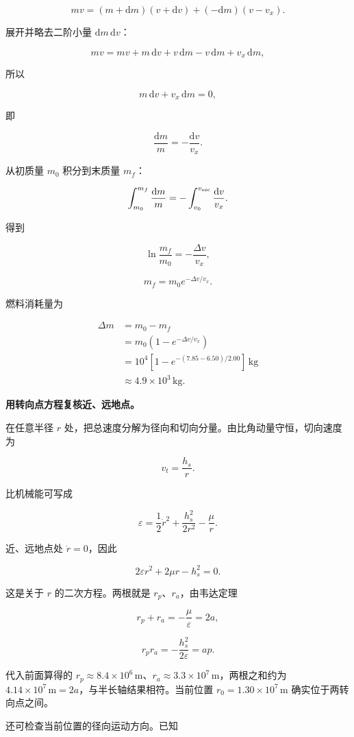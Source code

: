 \documentclass[12pt,a4paper,UTF8]{ctexart}
\begin{document}
\[mv=(m+\mathrm dm)(v+\mathrm dv)+(-\mathrm dm)(v-v_x).\]

展开并略去二阶小量 \(\mathrm dm\,\mathrm dv\)：

\[mv=mv+m\,\mathrm dv+v\,\mathrm dm-v\,\mathrm dm+v_x\,\mathrm dm,\]

所以

\[m\,\mathrm dv+v_x\,\mathrm dm=0,\]

即

\[\frac{\mathrm dm}{m}=-\frac{\mathrm dv}{v_x}.\]

从初质量 \(m_0\) 积分到末质量 \(m_f\)：

\[\int_{m_0}^{m_f}\frac{\mathrm dm}{m}
=-\int_{v_0}^{v_{\rm esc}}\frac{\mathrm dv}{v_x}.\]

得到

\[\ln\frac{m_f}{m_0}=-\frac{\Delta v}{v_x},\]

\[m_f=m_0e^{-\Delta v/v_x}.\]

燃料消耗量为

\[
\begin{aligned}
\Delta m
&=m_0-m_f\\
&=m_0\left(1-e^{-\Delta v/v_x}\right)\\
&=10^4\left[1-e^{-(7.85-6.50)/2.00}\right]\,\mathrm{kg}\\
&\approx\boxed{4.9\times10^3\,\mathrm{kg}}.
\end{aligned}
\]

\textbf{用转向点方程复核近、远地点。}

在任意半径 \(r\)
处，把总速度分解为径向和切向分量。由比角动量守恒，切向速度为

\[v_t=\frac{h_s}{r}.\]

比机械能可写成

\[\varepsilon=\frac12\dot r^2+\frac{h_s^2}{2r^2}-\frac\mu r.\]

近、远地点处 \(\dot r=0\)，因此

\[2\varepsilon r^2+2\mu r-h_s^2=0.\]

这是关于 \(r\) 的二次方程。两根就是 \(r_p\)、\(r_a\)，由韦达定理

\[r_p+r_a=-\frac{\mu}{\varepsilon}=2a,\]

\[r_pr_a=-\frac{h_s^2}{2\varepsilon}=ap.\]

代入前面算得的
\(r_p\approx8.4\times10^6\,\mathrm m\)、\(r_a\approx3.3\times10^7\,\mathrm m\)，两根之和约为
\(4.14\times10^7\,\mathrm m=2a\)，与半长轴结果相符。当前位置
\(r_0=1.30\times10^7\,\mathrm m\) 确实位于两转向点之间。

还可检查当前位置的径向运动方向。已知
\end{document}
